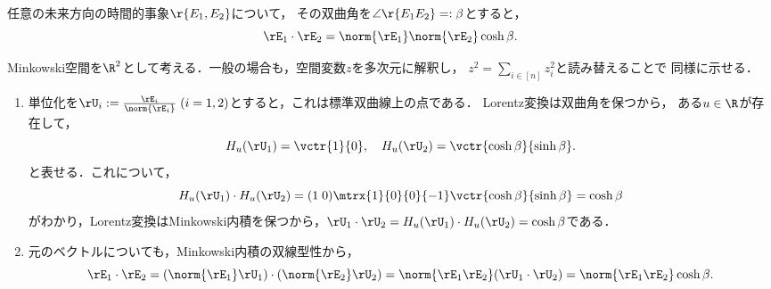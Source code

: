\documentclass[uplatex,dvipdfmx]{jsreport}
\begin{document}
\begin{theorem}
    任意の未来方向の時間的事象$\r{E_1,E_2}$について，
    その双曲角を$\angle\r{E_1E_2}=:\beta$とすると，
    \[\rE_1\cdot\rE_2=\norm{\rE_1}\norm{\rE_2}\cosh\beta.\]
\end{theorem}
\begin{Proof}
    Minkowski空間を$\R^2$として考える．一般の場合も，空間変数$z$を多次元に解釈し，
    $z^2=\sum_{i\in[n]}z_i^2$と読み替えることで
    同様に示せる．
    \begin{enumerate}[{Step}1]
        \item 単位化を$\rU_i:=\frac{\rE_i}{\norm{\rE_i}}\;(i=1,2)$とすると，これは標準双曲線上の点である．
        Lorentz変換は双曲角を保つから，
        ある$u\in\R$が存在して，
        \[H_u(\rU_1)=\vctr{1}{0},\quad H_u(\rU_2)=\vctr{\cosh\beta}{\sinh\beta}.\]
        と表せる．これについて，
        \[H_u(\rU_1)\cdot H_u(\rU_2)=(1\;0)\mtrx{1}{0}{0}{-1}\vctr{\cosh\beta}{\sinh\beta}=\cosh\beta\]
        がわかり，Lorentz変換はMinkowski内積を保つから，$\rU_1\cdot \rU_2=H_u(\rU_1)\cdot H_u(\rU_2)=\cosh\beta$である．
        \item 元のベクトルについても，Minkowski内積の双線型性から，
        \[\rE_1\cdot\rE_2=(\norm{\rE_1}\rU_1)\cdot(\norm{\rE_2}\rU_2)=\norm{\rE_1\rE_2}(\rU_1\cdot \rU_2)=\norm{\rE_1\rE_2}\cosh\beta.\]
    \end{enumerate}
\end{Proof}
\end{document}
